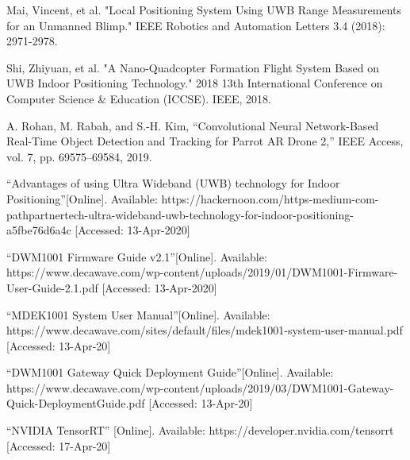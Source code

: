 \documentclass{IEEEtran}
\begin{document}
\begin{thebibliography}{1}
 Mai, Vincent, et al. "Local Positioning System Using UWB Range Measurements for an Unmanned Blimp." IEEE Robotics and Automation Letters 3.4 (2018): 2971-2978.

 Shi, Zhiyuan, et al. "A Nano-Quadcopter Formation Flight System Based on UWB Indoor Positioning Technology." 2018 13th International Conference on Computer Science \& Education (ICCSE). IEEE, 2018.

 A. Rohan, M. Rabah, and S.-H. Kim, “Convolutional Neural Network-Based Real-Time Object Detection and Tracking for Parrot AR Drone 2,” IEEE Access, vol. 7, pp. 69575–69584, 2019.

“Advantages of using Ultra Wideband (UWB) technology for Indoor Positioning”[Online]. Available: https://hackernoon.com/https-medium-com-pathpartnertech-ultra-wideband-uwb-technology-for-indoor-positioning-a5fbe76d6a4c [Accessed: 13-Apr-2020]

 “DWM1001 Firmware Guide v2.1”[Online]. Available: https://www.decawave.com/wp-content/uploads/2019/01/DWM1001-Firmware-User-Guide-2.1.pdf [Accessed: 13-Apr-2020]

 “MDEK1001 System User Manual”[Online]. Available: https://www.decawave.com/sites/default/files/mdek1001-system-user-manual.pdf [Accessed: 13-Apr-20]

 “DWM1001 Gateway Quick Deployment Guide”[Online]. Available: https://www.decawave.com/wp-content/uploads/2019/03/DWM1001-Gateway-Quick-DeploymentGuide.pdf [Accessed: 13-Apr-20]

 “NVIDIA TensorRT” [Online]. Available: https://developer.nvidia.com/tensorrt [Accessed: 17-Apr-20]

\end{thebibliography}

\end{document}
